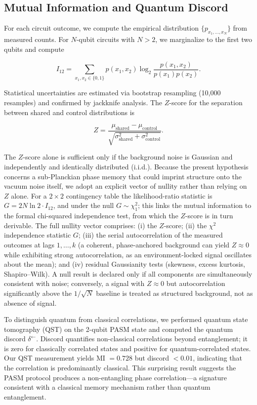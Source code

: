 ﻿\documentclass[12pt,a4paper]{article}
\begin{document}
\subsection{Mutual Information and Quantum Discord}

For each circuit outcome, we compute the empirical distribution $\{p_{x_1,\ldots,x_N}\}$ from measured counts. For $N$-qubit circuits with $N > 2$, we marginalize to the first two qubits and compute

\begin{equation}
I_{12} = \sum_{x_1,x_2 \in \{0,1\}} p(x_1,x_2) \log_2 \frac{p(x_1,x_2)}{p(x_1)p(x_2)}.
\label{eq:MI}
\end{equation}

Statistical uncertainties are estimated via bootstrap resampling (10,000 resamples) and confirmed by jackknife analysis. The $Z$-score for the separation between shared and control distributions is

\begin{equation}
Z = \frac{\mu_{\text{shared}} - \mu_{\text{control}}}{\sqrt{\sigma^2_{\text{shared}} + \sigma^2_{\text{control}}}}.
\end{equation}

The $Z$-score alone is sufficient only if the background noise is Gaussian and independently and identically distributed (i.i.d.). Because the present hypothesis concerns a sub-Planckian phase memory that could imprint structure onto the vacuum noise itself, we adopt an explicit vector of nullity rather than relying on $Z$ alone. For a $2\times2$ contingency table the likelihood-ratio statistic is $G = 2N\ln 2 \cdot I_{12}$, and under the null $G \sim \chi^2_1$; this links the mutual information to the formal chi-squared independence test, from which the $Z$-score is in turn derivable. The full nullity vector comprises: (i) the $Z$-score; (ii) the $\chi^2$ independence statistic $G$; (iii) the serial autocorrelation of the measured outcomes at lags $1,\ldots,k$ (a coherent, phase-anchored background can yield $Z \approx 0$ while exhibiting strong autocorrelation, as an environment-locked signal oscillates about the mean); and (iv) residual Gaussianity tests (skewness, excess kurtosis, Shapiro--Wilk). A null result is declared only if all components are simultaneously consistent with noise; conversely, a signal with $Z \approx 0$ but autocorrelation significantly above the $1/\sqrt{N}$ baseline is treated as structured background, not as absence of signal.

To distinguish quantum from classical correlations, we performed quantum state tomography (QST) on the 2-qubit PASM state and computed the quantum discord $\delta^\leftarrow$. Discord quantifies non-classical correlations beyond entanglement; it is zero for classically correlated states and positive for quantum-correlated states. Our QST measurement yields MI $= 0.728$ but discord $< 0.01$, indicating that the correlation is predominantly classical. This surprising result suggests the PASM protocol produces a non-entangling phase correlation---a signature consistent with a classical memory mechanism rather than quantum entanglement.
\end{document}
